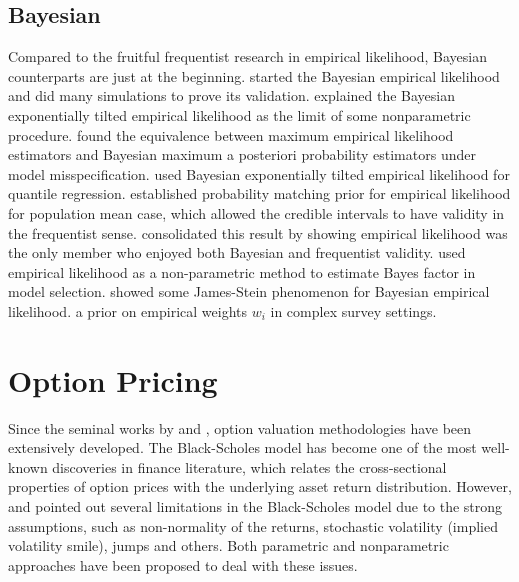 \subsection{Bayesian }

Compared to the fruitful frequentist research in empirical likelihood,
Bayesian counterparts are just at the beginning. \citet{lazar2003bayesian}
started the Bayesian empirical likelihood and did many simulations
to prove its validation. \citet{schennach2005bayesian,schennach2007point}
explained the Bayesian exponentially tilted empirical likelihood as
the limit of some nonparametric procedure. \citet{grendar2009asymptotic}
found the equivalence between maximum empirical likelihood estimators
and Bayesian maximum a posteriori probability estimators under model
misspecification. \citet{lancaster2010bayesian} used Bayesian exponentially
tilted empirical likelihood for quantile regression. \citet{fang2005expected,fang2006empirical}
established probability matching prior for empirical likelihood for
population mean case, which allowed the credible intervals to have
validity in the frequentist sense. \citet{chang2008bayesian} consolidated
this result by showing empirical likelihood was the only member who
enjoyed both Bayesian and frequentist validity. \citet{vexler2013nonparametric}
used empirical likelihood as a non-parametric method to estimate Bayes
factor in model selection. \citet{vexler2014posterior} showed some
James-Stein phenomenon for Bayesian empirical likelihood. \citet{rao2010bayesian}
 a prior on empirical
weights $w_{i}$ in complex survey settings.

\begin{comment}
more papers in abc folder, pro and con of el
\end{comment}



\section{Option Pricing}

Since the seminal works by \citet{black1973pricing} and \citet{merton1973intertemporal},
option valuation methodologies have been extensively developed. The
Black-Scholes model has become one of the most well-known discoveries
in finance literature, which relates the cross-sectional properties
of option prices with the underlying asset return distribution.
However, \citet{rubinstein1985nonparametric} and \citet{melino1990pricing} pointed out
several limitations in the Black-Scholes model due to the strong assumptions,
such as non-normality of the returns, stochastic volatility (implied
volatility smile), jumps and others. Both parametric and nonparametric
approaches have been proposed to deal with these issues. 


